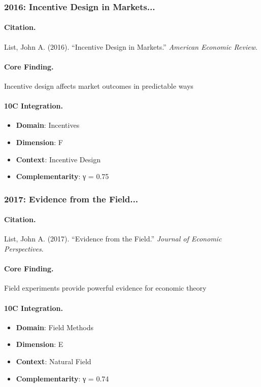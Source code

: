 \subsubsection{2016: Incentive Design in Markets...}

\paragraph{Citation.}
List, John A. (2016). ``Incentive Design in Markets.''
\textit{American Economic Review}.

\paragraph{Core Finding.}
Incentive design affects market outcomes in predictable ways

\paragraph{10C Integration.}
\begin{itemize}[nosep]
  \item \textbf{Domain}: Incentives
  \item \textbf{Dimension}: F
  \item \textbf{Context}: Incentive Design
  \item \textbf{Complementarity}: γ = 0.75
\end{itemize}


\subsubsection{2017: Evidence from the Field...}

\paragraph{Citation.}
List, John A. (2017). ``Evidence from the Field.''
\textit{Journal of Economic Perspectives}.

\paragraph{Core Finding.}
Field experiments provide powerful evidence for economic theory

\paragraph{10C Integration.}
\begin{itemize}[nosep]
  \item \textbf{Domain}: Field Methods
  \item \textbf{Dimension}: E
  \item \textbf{Context}: Natural Field
  \item \textbf{Complementarity}: γ = 0.74
\end{itemize}



